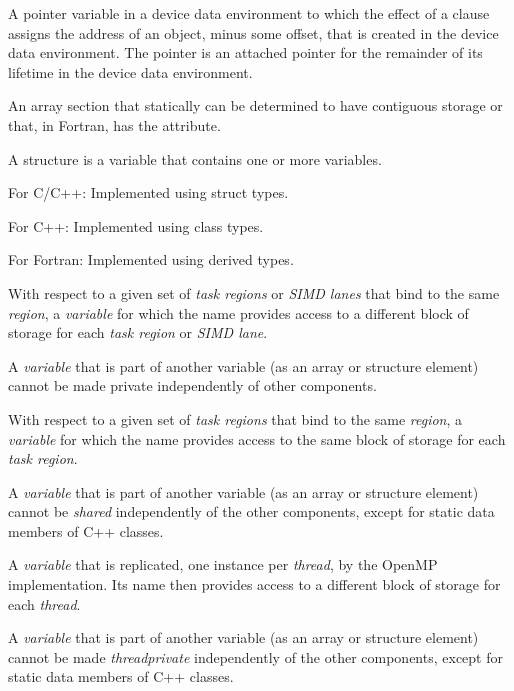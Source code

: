 \glossarydefstart
A pointer variable in a device data environment to which the effect of a
 clause assigns the address of an object, minus some offset,  that
is created in the device data environment. The pointer is an attached pointer
for the remainder of its lifetime in the device data environment.
\glossarydefend
\bigskip

\glossarydefstart
An array section that statically can be determined to have contiguous 
storage or that, in Fortran, has the  attribute.
\glossarydefend
\bigskip

\glossarydefstart
A structure is a variable that contains one or more variables.

For C/C++:
\nopagebreak
Implemented using struct types.

For C++:
\nopagebreak
Implemented using class types.

For Fortran:
\nopagebreak
Implemented using derived types.
\glossarydefend

\glossarydefstart
With respect to a given set of \emph{task regions} or \emph{SIMD lanes} 
that bind to the same  \emph{region}, a \emph{variable} 
for which the name provides access to a different block of
storage for each \emph{task region} or \emph{SIMD lane}.

A \emph{variable} that is part of another variable (as an array or 
structure element) cannot be made private independently of other components.
\glossarydefend

\glossarydefstart
With respect to a given set of \emph{task regions} that bind to the same 
 \emph{region}, a \emph{variable} for which the name 
provides access to the same block of storage for each \emph{task region}.

A \emph{variable} that is part of another variable (as an array or 
structure element) cannot be \emph{shared} independently of the other 
components, except for static data members of C++ classes.
\glossarydefend

\glossarydefstart
A \emph{variable} that is replicated, one instance per \emph{thread}, by the 
OpenMP implementation. Its name then provides access to a different block of 
storage for each \emph{thread}.

A \emph{variable} that is part of another variable (as an array or structure 
element) cannot be made \emph{threadprivate} independently of the other 
components, except for static data members of C++ classes.
\glossarydefend

